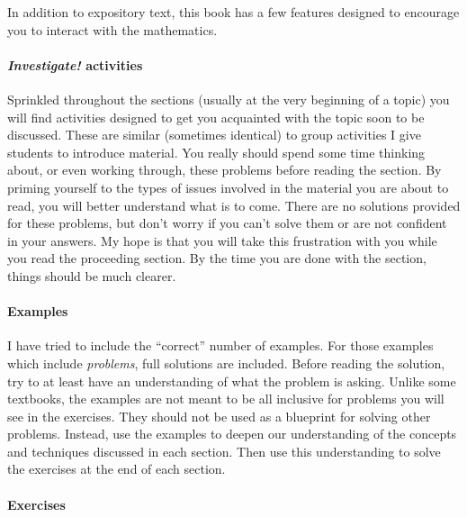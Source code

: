 \documentclass[10pt,]{book}
\theoremstyle{plain}
\theoremstyle{definition}
\theoremstyle{definition}
\theoremstyle{definition}
\numberwithin{equation}{section}
\begin{document}
  In addition to expository text, this book has a few features designed to encourage you to interact with the mathematics.
\typeout{************************************************}
\typeout{************************************************}
\paragraph[\emph{Investigate!} activities]{\emph{Investigate!} activities}\label{paragraphs-2}

  Sprinkled throughout the sections (usually at the very beginning of a topic) you will find activities designed to get you acquainted with the topic soon to be discussed. These are similar (sometimes identical) to group activities I give students to introduce material. You really should spend some time thinking about, or even working through, these problems before reading the section. By priming yourself to the types of issues involved in the material you are about to read, you will better understand what is to come. There are no solutions provided for these problems, but don't worry if you can't solve them or are not confident in your answers. My hope is that you will take this frustration with you while you read the proceeding section. By the time you are done with the section, things should be much clearer.
\typeout{************************************************}
\typeout{************************************************}
\paragraph[Examples]{Examples}\label{paragraphs-3}

  I have tried to include the ``correct'' number of examples. For those examples which include \emph{problems}, full solutions are included. Before reading the solution, try to at least have an understanding of what the problem is asking. Unlike some textbooks, the examples are not meant to be all inclusive for problems you will see in the exercises. They should not be used as a blueprint for solving other problems. Instead, use the examples to deepen our understanding of the concepts and techniques discussed in each section. Then use this understanding to solve the exercises at the end of each section.
\typeout{************************************************}
\typeout{************************************************}
\paragraph[Exercises]{Exercises}\label{paragraphs-4}
\end{document}
